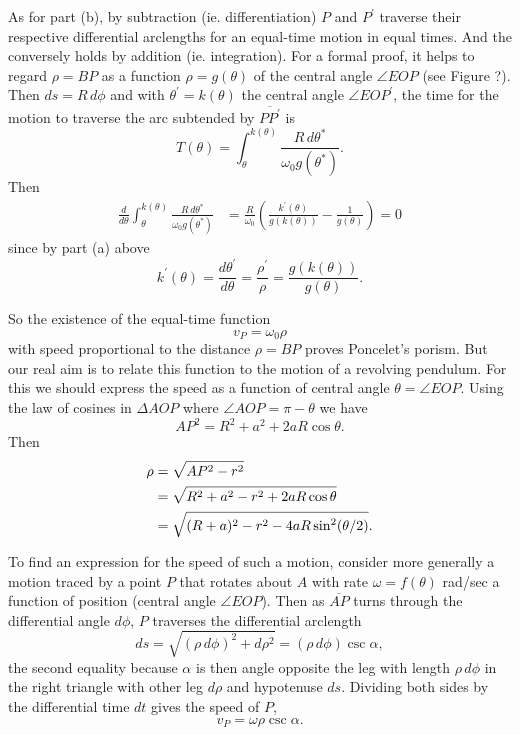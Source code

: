 \documentclass{ximera}
\begin{document}
As for part (b), by subtraction (ie. differentiation)  $P$ and $P^\prime$ traverse their respective differential arclengths for an equal-time motion in equal times. And the conversely holds by addition (ie. integration). For a formal proof, it helps to regard $\rho = BP$ as a function $\rho = g(\theta)$ of the central angle $\angle EOP$ (see Figure ?). Then $ds = R \, d\phi$ and with $\theta^\prime = k(\theta)$ the central angle $\angle EOP^\prime$, the time for the motion to traverse the arc subtended by $\overline{PP^\prime}$ is
\[
  T(\theta) =  \int_\theta^{k(\theta)} \frac{R\, d\theta^*}{\omega_0 g(\theta^*)}.
\]
Then
\begin{align*}
  \frac{d}{d\theta} \int_\theta^{k(\theta)} \frac{R\, d\theta^*}{\omega_0 g(\theta^*)} &= \frac{R}{\omega_0}\left(   \frac{k^\prime(\theta)}{g(k(\theta))} - \frac{1}{g(\theta)}        \right) = 0
\end{align*}
since by part (a) above
\[
   k^\prime(\theta) = \frac{d\theta^\prime}{d\theta} =   \frac{\rho^\prime}{\rho}   = \frac{g(k(\theta))}{g(\theta)}.
\]

So the existence of the equal-time function
\[
      v_P = \omega_0 \rho
\]
with speed proportional to the distance $\rho = BP$ proves Poncelet's porism. But our real aim is to relate this function to the motion of a revolving pendulum. For this we should express the speed as a function of central angle $\theta = \angle EOP$. Using the law of cosines in $\Delta AOP$ where $\angle AOP = \pi - \theta$ we have
\[
  AP^2  = R^2 + a^2 + 2aR \cos \theta .
\]
Then
\begin{align*}
   \rho  &=  \sqrt{AP^2 - r^2}         \\  \notag
          & = \sqrt{R^2 + a^2 -r^2 + 2aR \cos \theta}  \\ \notag
          &=   \sqrt{(R+a)^2 - r^2 - 4aR\sin^2 (\theta/2)} .\label{Eq:PropSpeed}
\end{align*}



\iffalse
To find an expression for the speed of such a motion, consider more generally a motion traced by a point $P$ that rotates about $A$ with rate $\omega = f(\theta)$ rad/sec a function of position (central angle $\angle EOP$). Then as $\overline{AP}$ turns through the differential angle $d\phi$, $P$ traverses the differential arclength
\[
   ds =  \sqrt{(\rho \, d\phi)^2 + d\rho^2}   =   (\rho \, d\phi) \csc \alpha ,
\]
the second equality because $\alpha$ is then angle opposite the leg with length $\rho \, d\phi$ in the right triangle with other leg $d\rho$ and hypotenuse $ds$. Dividing both sides by the differential time $dt$ gives the speed of $P$,
\[
     v_P  = \omega \rho \csc \alpha .
\]
\end{document}
